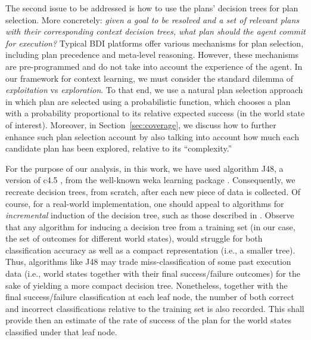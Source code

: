 The second issue to be addressed is how to use the plans' decision trees for plan
selection. More concretely: \emph{given a goal to be resolved and a set of
relevant plans with their corresponding context decision trees, what plan should
the agent commit for execution?}
Typical BDI platforms offer various mechanisms for plan selection, including plan
precedence and meta-level reasoning. However, these mechanisms are pre-programmed
and do not take into account the experience of the agent.
In our framework for context learning, we must consider the standard dilemma of
\emph{exploitation} vs \emph{exploration}. To that end, we use a natural plan
selection approach in which plan are selected using a probabilistic function,
which chooses a plan with a probability proportional to its relative expected
success (in the world state of interest). Moreover, in
Section~\ref{sec:coverage}, we discuss how to further enhance such plan selection
account by also talking into account how much each candidate plan has been
explored, relative to its ``complexity.''



For the purpose of our analysis, in this work, we have used algorithm
\textsf{J48}, a version of \textsf{c4.5} \cite{Mitchell97:ML}, from the
well-known \textsf{weka} learning package \cite{weka99}. Consequently, we
recreate decision trees, from scratch, after each new piece of data is collected.
Of course, for a real-world implementation, one should appeal to algorithms for
\emph{incremental} induction of the decision tree, such as those described in
\cite{Swere06:Fast,Utgoff97Decision}.
Observe that any algorithm for inducing a decision tree from a training set (in
our case, the set of outcomes for different world states), would struggle for
both classification accuracy as well as a compact representation (i.e., a smaller
tree). Thus, algorithms like \textsf{J48}  may trade miss-classification of some
 past execution data (i.e., world states together with their final
success/failure outcomes) for the sake of yielding a more compact decision tree.
Nonetheless, together with the final success/failure classification at each leaf
node, the number of both correct and incorrect classifications relative to
the training set is also recorded. This shall provide then an estimate of the
rate of success of the plan for the world states classified under that leaf
node.



